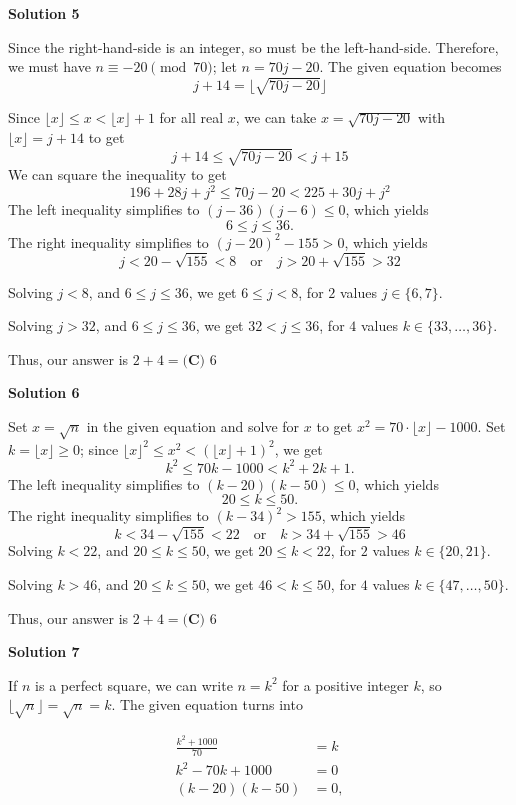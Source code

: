 \begin{enumerate}
 



\textbf{Solution 5}

Since the right-hand-side is an integer, so must be the left-hand-side. Therefore, we must have $n\equiv -20\pmod{70}$; let $n=70j-20$. The given equation becomes
 \[j+14 = \lfloor \sqrt{70j-20} \rfloor\]

 Since $\lfloor x \rfloor \leq x < \lfloor x \rfloor +1$ for all real $x$, we can take $x=\sqrt{70j-20}$ with $\lfloor x \rfloor =j+14$ to get
 \[j+14 \leq \sqrt{70j-20} < j+15\]We can square the inequality to get
 \[196+28j+j^{2} \leq 70j-20 < 225 + 30j + j^{2}\]The left inequality simplifies to $(j-36)(j-6) \leq 0$, which yields 
 \[6 \le j \le 36.\]The right inequality simplifies to $(j-20)^2 - 155 > 0$, which yields 
 \[j < 20 - \sqrt{155} < 8 \quad \text{or} \quad j > 20 + \sqrt{155} > 32\] 

 Solving $j < 8$, and $6 \le j \le 36$, we get $6 \le j < 8$, for $2$ values $j\in \{6, 7\}$.

 Solving $j >32$, and $6 \le j \le 36$, we get $32 < j \le 36$, for $4$ values $k\in \{33, \ldots , 36\}$.

 Thus, our answer is $2 + 4 = \boxed{\textbf{(C) }6}$




\textbf{Solution 6}

Set $x=\sqrt{n}$ in the given equation and solve for $x$ to get $x^2 = 70 \cdot \lfloor x \rfloor - 1000$. Set $k = \lfloor x \rfloor \ge 0$; since $\lfloor x \rfloor^2 \le x^2 < (\lfloor x \rfloor + 1)^2$, we get  
 \[k^2 \le  70k - 1000 < k^2 + 2k + 1.\]The left inequality simplifies to $(k-20)(k-50) \le 0$, which yields 
 \[20 \le k \le 50.\]The right inequality simplifies to $(k-34)^2 > 155$, which yields 
 \[k < 34 - \sqrt{155} < 22 \quad \text{or} \quad k > 34 + \sqrt{155} > 46\] Solving $k < 22$, and $20 \le k \le 50$, we get $20 \le k < 22$, for $2$ values $k\in \{20, 21\}$.

 Solving $k >46$, and $20 \le k \le 50$, we get $46 < k \le 50$, for $4$ values $k\in \{47, \ldots , 50\}$.

 Thus, our answer is $2 + 4 = \boxed{\textbf{(C) }6}$




\textbf{Solution 7}

If $n$ is a perfect square, we can write $n = k^2$ for a positive integer $k$, so $\lfloor \sqrt{n} \rfloor = \sqrt{n} = k.$ The given equation turns into 

 \begin{align*}\frac{k^2 + 1000}{70} &= k \\k^2 - 70k + 1000 &= 0 \\(k-20)(k-50) &= 0,\end{align*}



\end{enumerate}
